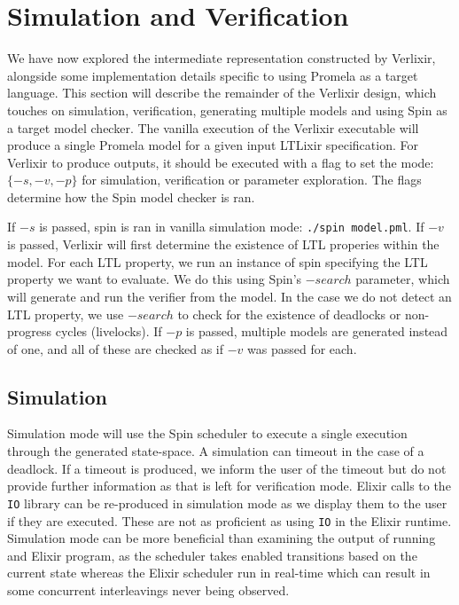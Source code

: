 \section{Simulation and Verification} \label{sec:simulation_verification}
We have now explored the intermediate representation constructed by Verlixir, alongside some implementation details specific to using Promela as a target language. This section will describe the remainder of the Verlixir design, which touches on simulation, verification, generating multiple models and using Spin as a target model checker. The vanilla execution of the Verlixir executable will produce a single Promela model for a given input LTLixir specification. For Verlixir to produce outputs, it should be executed with a flag to set the mode: $\{-s, -v, -p\}$ for simulation, verification or parameter exploration. The flags determine how the Spin model checker is ran.
\par
If $-s$ is passed, spin is ran in vanilla simulation mode: \texttt{./spin model.pml}. If $-v$ is passed, Verlixir will first determine the existence of LTL properies within the model. For each LTL property, we run an instance of spin specifying the LTL property we want to evaluate. We do this using Spin's $-search$ parameter, which will generate and run the verifier from the model. In the case we do not detect an LTL property, we use $-search$ to check for the existence of deadlocks or non-progress cycles (livelocks). If $-p$ is passed, multiple models are generated instead of one, and all of these are checked as if $-v$ was passed for each.
\subsection{Simulation}
Simulation mode will use the Spin scheduler to execute a single execution through the generated state-space. A simulation can timeout in the case of a deadlock. If a timeout is produced, we inform the user of the timeout but do not provide further information as that is left for verification mode. Elixir calls to the \texttt{IO} library can be re-produced in simulation mode as we display them to the user if they are executed. These are not as proficient as using \texttt{IO} in the Elixir runtime. Simulation mode can be more beneficial than examining the output of running and Elixir program, as the scheduler takes enabled transitions based on the current state whereas the Elixir scheduler run in real-time which can result in some concurrent interleavings never being observed.
